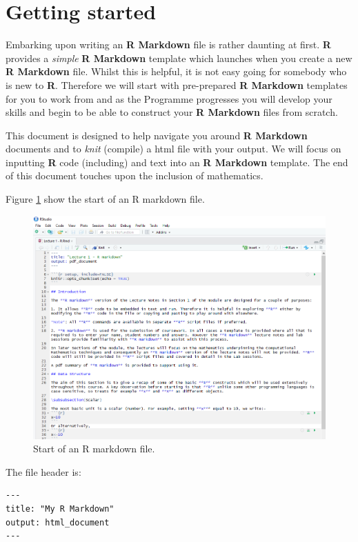 \documentclass[
]{book}
\begin{document}
\hypertarget{Rmark_start}{%
\section{Getting started}\label{Rmark_start}}

Embarking upon writing an \textbf{R Markdown} file is rather daunting at first. \textbf{R} provides a \emph{simple} \textbf{R Markdown} template which launches when you create a new \textbf{R Markdown} file. Whilst this is helpful, it is not easy going for somebody who is new to \textbf{R}. Therefore we will start with pre-prepared \textbf{R Markdown} templates for you to work from and as the Programme progresses you will develop your skills and begin to be able to construct your \textbf{R Markdown} files from scratch.

This document is designed to help navigate you around \textbf{R Markdown} documents and to \emph{knit} (compile) a html file with your output. We will focus on inputting \textbf{R} code (including) and text into an \textbf{R Markdown} template. The end of this document touches upon the inclusion of mathematics.

Figure \ref{fig:Rmark1} show the start of an R markdown file.

\begin{figure}
\includegraphics[width=0.8\linewidth]{Images/Rmarkdown_3} \caption{Start of an R markdown file.}\label{fig:Rmark1}
\end{figure}

The file header is:

\begin{verbatim}
---
title: "My R Markdown"
output: html_document
---
\end{verbatim}
\end{document}

